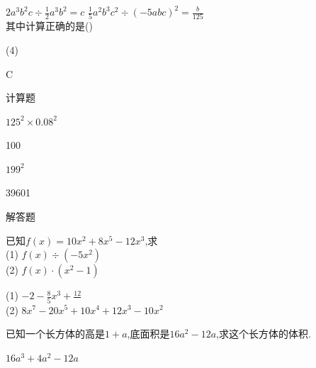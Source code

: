 \documentclass[cn,blue,12pt]{elegantbook}
\begin{document}
\begin{shiti}
\begin{shiti}[resume]
             \(2a^3b^2c \div \frac{1}{2}a^3b^2=c\) \qquad {} \(\frac{1}{5}a^2b^3c^2 \div (-5abc)^2 = \frac{b}{125}\)\\
            其中计算正确的是(\qquad)\\
            \begin{tasks}(4)
                \task {} 
                \task {} 
                \task {} 
                \task {} 
            \end{tasks}
\begin{solution}
                C\\
\end{solution}

        \end{shiti}
    \item 计算题
        \begin{shiti}[resume]
        \item \(125^2 \times 0.08^2\)
\begin{solution}
                100\\
\end{solution}
        \item \(199^2\)\\
\begin{solution}
                39601\\
\end{solution}
        \end{shiti}
    \item 解答题
        \begin {shiti}[resume]
    \item 已知\(f(x)=10x^2+8x^5-12x^3\),求\\
        (1) \(f(x) \div (-5x^2)\)\\
        (2) \(f(x)\cdot (x^2-1)\)
\begin{solution}
            (1) \(-2-\frac{8}{5}x^3+\frac{12}{}\)\\
            (2) \(8x^7-20x^5+10x^4+12x^3-10x^2\)
\end{solution}
    \item 已知一个长方体的高是\( 1 + a \),底面积是\(16a^2-12a\),求这个长方体的体积.
\begin{solution}
            \(16a^3+4a^2-12a\)\\
\end{solution}
        \end {shiti}
    \end{shiti}
\end{document}
